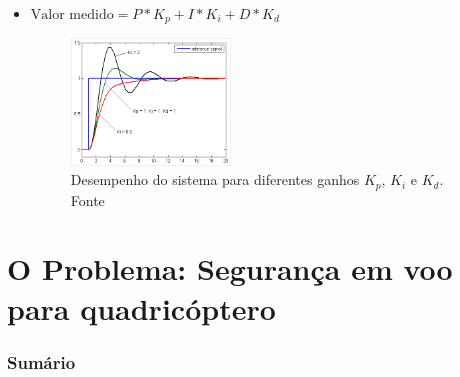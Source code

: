 \documentclass{beamer}
\begin{document}
\begin{frame}[allowframebreaks]
\begin{itemize}
		\item $ \mbox{Valor medido} = P*K_p + I*K_i + D*K_d$
		
		\vspace{0.6cm}
		\begin{figure}[h]
			\centering
			\includegraphics[keepaspectratio = true,
			width=0.4\textwidth]{img/ganho_PID.png}
			\caption{Desempenho do sistema para diferentes ganhos $K_p$, $K_i$ e $K_d$. Fonte \cite{Kingdom}}
			\label{fig:ganhoPID}
		\end{figure}	
	
	\end{itemize}
	
\end{frame}	

%	
%	
%	
%	
%	
%	


\section{O Problema: Segurança em voo para quadricóptero}

\begin{frame}
	\frametitle{Sumário}
	\tableofcontents[currentsection]
\end{frame}
\end{document}
